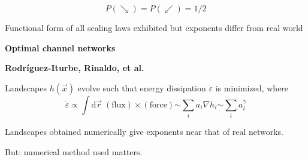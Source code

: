 \begin{frame}[label=]
\begin{frame}[label=]
\begin{frame}[label=]
\begin{frame}[label=]
\begin{frame}[label=]
\begin{frame}[label=]
\begin{frame}[label=]
\begin{frame}[label=]
\begin{frame}[label=]
\begin{frame}[label=]
\begin{frame}[label=]
\begin{frame}[label=]
\begin{frame}[label=]
\begin{frame}[label=]
\begin{frame}[label=]
\begin{frame}[label=]
\begin{frame}[label=]
\begin{frame}[label=]
\begin{frame}[label=]
\begin{frame}[label=]
\begin{frame}[label=]
\begin{frame}[label=]
\begin{frame}[label=]
\begin{frame}[label=]
\begin{frame}[label=]
\begin{frame}[label=]
\begin{frame}[label=]
\begin{frame}[label=]
\begin{frame}[label=]
\begin{frame}[label=]
\begin{frame}[label=]
\begin{frame}[label=]
\begin{frame}[label=]
\begin{frame}[label=]
\begin{frame}[label=]
\begin{frame}[label=]
\begin{frame}[label=]
\begin{frame}[label=]
\begin{frame}[label=]
\begin{frame}[label=]
\begin{frame}[label=]
\begin{frame}[label=]
\begin{frame}[label=]
\begin{frame}[label=]
\begin{frame}[label=]
\begin{frame}[label=]
\begin{frame}[label=]
\begin{frame}[label=]
\begin{frame}[label=]
\begin{frame}[label=]
\begin{frame}[label=]
\begin{frame}[label=]
\begin{frame}[label=]
\begin{frame}[label=]
\begin{frame}[label=]
\begin{frame}[label=]
\begin{frame}[label=]
\begin{frame}[label=]
\begin{frame}[label=]
\begin{frame}[label=]
\begin{frame}[label=]
\begin{frame}[label=]
    
      $$P(\searrow) = P (\swarrow) = 1/2$$
    
      Functional form of all scaling laws exhibited
      but exponents differ from real world\cite{takayasu1988a,takayasu1989a,takayasu1989b}
    
  



\begin{frame}[label=]
  \textbf{Optimal channel networks}

  \textbf{Rodr\'iguez-Iturbe, Rinaldo, et al.\cite{rodriguez-iturbe1997a}}
    
     
      Landscapes $h(\vec{x})$ evolve such that
      energy dissipation $\dot{\varepsilon}$ is minimized, where 
      $$
      {
      \dot{\varepsilon} 
        \propto \int \mbox{d}\vec{r} \; (\mbox{flux}) \times (\mbox{force}) 
      }
      {
        \sim  \sum_i a_i \nabla h_i 
      }
      {
        \sim  \sum_i a_i^\gamma 
      }
      $$
    
      Landscapes obtained numerically give exponents near that of real networks.
    
      \alert{But:}
      numerical method used matters.
    

\end{frame}
\end{frame}
\end{frame}
\end{frame}
\end{frame}
\end{frame}
\end{frame}
\end{frame}
\end{frame}
\end{frame}
\end{frame}
\end{frame}
\end{frame}
\end{frame}
\end{frame}
\end{frame}
\end{frame}
\end{frame}
\end{frame}
\end{frame}
\end{frame}
\end{frame}
\end{frame}
\end{frame}
\end{frame}
\end{frame}
\end{frame}
\end{frame}
\end{frame}
\end{frame}
\end{frame}
\end{frame}
\end{frame}
\end{frame}
\end{frame}
\end{frame}
\end{frame}
\end{frame}
\end{frame}
\end{frame}
\end{frame}
\end{frame}
\end{frame}
\end{frame}
\end{frame}
\end{frame}
\end{frame}
\end{frame}
\end{frame}
\end{frame}
\end{frame}
\end{frame}
\end{frame}
\end{frame}
\end{frame}
\end{frame}
\end{frame}
\end{frame}
\end{frame}
\end{frame}
\end{frame}
\end{frame}
\end{frame}
